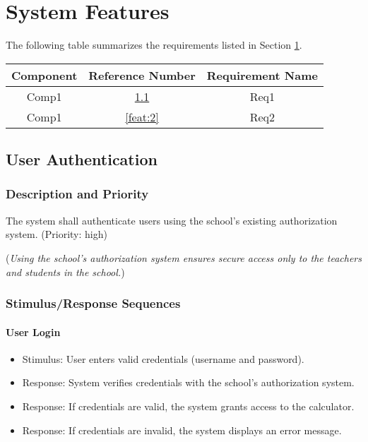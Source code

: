 \documentclass{scrreprt}
\begin{document}
\chapter{System Features}
\label{sec:features}
The following table summarizes the requirements listed in Section \ref{sec:features}.

\begin{center}
\begin{tabular}{|c|c|c|}

\hline
Component & Reference Number & Requirement Name\\
\hline
Comp1 & \ref{feat:1} & Req1 \\
Comp1 & \ref{feat:2} & Req2 \\
\hline

\end{tabular}
\end{center}

\section{User Authentication}
\label{feat:1}

\subsection{Description and Priority}
The system shall authenticate users using the school's existing authorization system. (Priority: high)

(\textit{Using the school's authorization system ensures secure access only to the teachers and students in the school.})

\subsection{Stimulus/Response Sequences}
\subsubsection*{User Login}
\begin{itemize}
    \item Stimulus: User enters valid credentials (username and password).
    \item Response: System verifies credentials with the school's authorization system.
    \item Response: If credentials are valid, the system grants access to the calculator.
    \item Response: If credentials are invalid, the system displays an error message.
\end{itemize}
\end{document}
